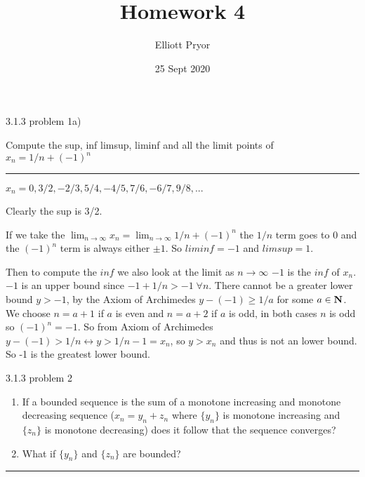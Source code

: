 \documentclass[11pt]{article}
\title{Homework 4}
\author{Elliott Pryor}
\date{25 Sept 2020}
\begin{document}
\maketitle



 3.1.3 problem 1a)

Compute the sup, inf limsup, liminf and all the limit points of $x_n = 1/n + (-1)^n$

\hrule


$x_n = 0, 3/2, -2/3, 5/4, -4/5, 7/6, -6/7, 9/8, ...$

Clearly the sup is 3/2. 

If we take the $\lim_{n \to \infty} x_n = \lim_{n \to \infty} 1/n + (-1)^n$ the $1/n$ term goes to $0$ and the $(-1)^n$ term is always either $\pm 1$. So $liminf = -1$ and $limsup = 1$. 

Then to compute the $inf$ we also look at the limit as $n \to \infty$ $-1$ is the $inf$ of $x_n$. $-1$ is an upper bound since $-1 + 1/n > -1 \; \forall n$. There cannot be a greater lower bound $y > -1$, by the Axiom of Archimedes $y - (-1) \geq 1/a$ for some $a \in \mathbf{N}$. We choose $n = a + 1$ if $a$ is even and $n = a + 2$ if $a$ is odd, in both cases $n$ is odd so $(-1)^n = -1$. So from Axiom of Archimedes $y - (-1) > 1/n \leftrightarrow y > 1/n - 1 = x_n$, so $y > x_n$ and thus is not an lower bound. So -1 is the greatest lower bound.



\newpage
{} 3.1.3 problem 2

\begin{enumerate}
 \item If a bounded sequence is the sum of a monotone increasing and monotone decreasing sequence ($x_n = y_n + z_n$ where $\{y_n\}$ is monotone increasing and $\{z_n\}$ is monotone decreasing) does it follow that the sequence converges? 
 
 \item What if $\{y_n\}$ and $\{z_n\}$ are bounded?
\end{enumerate}

\hrule
\end{document}
